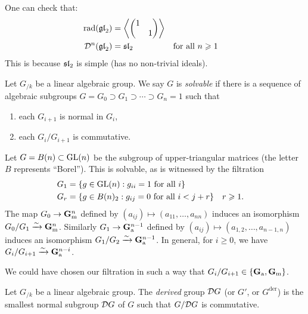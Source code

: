 \begin{example}
One can check that: 
\begin{align*}
  \operatorname{rad}(\mathfrak{gl}_2) &= \left\langle \begin{pmatrix} 1 \\ & 1 \end{pmatrix}\right\rangle \\
  \mathcal{D}^n(\mathfrak{gl}_2) &= \mathfrak{sl}_2 && \text{for all }n\geqslant 1 
\end{align*}
This is because $\mathfrak{sl}_2$ is simple (has no non-trivial ideals). 
\end{example}

\begin{definition}
Let $G_{/k}$ be a linear algebraic group. We say $G$ is \emph{solvable} if 
there is a sequence of algebraic subgroups 
$G=G_0\supset G_1\supset \cdots \supset G_n=1$ such that 
\begin{enumerate}
  \item each $G_{i+1}$ is normal in $G_i$, 
  \item each $G_i/G_{i+1}$ is commutative. 
\end{enumerate}
\end{definition}

\begin{example}
Let $G=B(n)\subset \operatorname{GL}(n)$ be the subgroup of upper-triangular matrices (the 
letter $B$ represents ``Borel''). This is solvable, as is witnessed by the 
filtration 
\begin{align*}
  G_1 &= \{g\in \operatorname{GL}(n):g_{i i}=1\text{ for all }i\} \\
  G_r &= \{g\in B(n)_2:g_{i j}=0\text{ for all }i<j+r\} && r\geqslant 1 .
\end{align*}
The map $G_0\to \mathbf{G}_\mathrm{m}^n$ defined by $(a_{i j})\mapsto (a_{11},\dots,a_{nn})$ 
induces an isomorphism $G_0/G_1\xrightarrow\sim \mathbf{G}_\mathrm{m}^n$. Similarly 
$G_1\to \mathbf{G}_\mathrm{a}^{n-1}$ defined by $(a_{i j})\mapsto (a_{1,2},\dots,a_{n-1,n})$ 
induces an isomorphism $G_1/G_2\xrightarrow\sim \mathbf{G}_\mathrm{a}^{n-1}$. In general, for $i\geqslant 0$, 
we have $G_{i}/G_{i+1} \xrightarrow\sim \mathbf{G}_\mathrm{a}^{n-i}$. 

We could have chosen our filtration in such a way that 
$G_i/G_{i+1}\in \{\mathbf{G}_\mathrm{a},\mathbf{G}_\mathrm{m}\}$. 
\end{example}

\begin{definition}
Let $G_{/k}$ be a linear algebraic group. The \emph{derived} group 
$\mathcal{D} G$ (or $G'$, or $G^\mathrm{der}$) is the smallest normal subgroup 
$\mathcal{D} G$ of $G$ such that $G/\mathcal{D} G$ is commutative. 
\end{definition}

